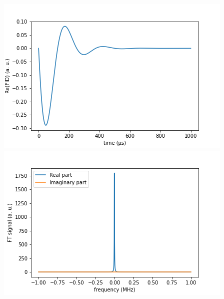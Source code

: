 \documentclass[10pt]{beamer}
\begin{document}
\begin{frame}
\begin{columns}[T]
\begin{column}{.5\textwidth}
\begin{column}{.5\textwidth}
\end{column}
\end{column}
\begin{column}{.5\textwidth}
\includegraphics[width=\textwidth]{./spin1-2/31correlated_pure_no_interactions/FIDSignal.png}
\includegraphics[width=\textwidth]{./spin1-2/31correlated_pure_no_interactions/FTSignal.png}
\end{column}
\end{columns}
\end{frame}
\end{document}

